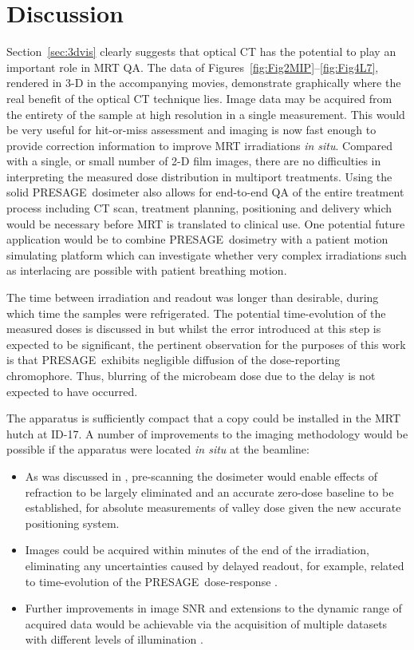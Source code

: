 	
	\section{Discussion}
	Section~\ref{sec:3dvis} clearly suggests that optical CT has the potential to play an important role in MRT QA. The data of Figures~\ref{fig:Fig2MIP}--\ref{fig:Fig4L7}, rendered in 3-D in the accompanying movies, demonstrate graphically where the real benefit of the optical CT technique lies. Image data may be acquired from the entirety of the sample at high resolution in a single measurement. This would be very useful for hit-or-miss assessment and imaging is now fast enough to provide correction information to improve MRT irradiations \textit{in situ}. Compared with a single, or small number of 2-D film images, there are no difficulties in interpreting the measured dose distribution in multiport treatments. Using the solid PRESAGE\textregistered \ dosimeter also allows for end-to-end QA of the entire treatment process including CT scan, treatment planning, positioning and delivery which would be necessary before MRT is translated to clinical use. One potential future application would be to combine PRESAGE\textregistered \ dosimetry with a patient motion simulating platform which can investigate whether very complex irradiations such as interlacing are possible with patient breathing motion. 
	
	The time between irradiation and readout was longer than desirable, during which time the samples were refrigerated. The potential time-evolution of the measured doses is discussed in \cite{doranestablishing2013} but whilst the error introduced at this step is expected to be significant, the pertinent observation for the purposes of this work is that PRESAGE\textregistered \ exhibits negligible diffusion of the dose-reporting chromophore. Thus, blurring of the microbeam dose due to the delay is not expected to have occurred.
	
	The apparatus is sufficiently compact that a copy could be installed in the MRT hutch at ID-17. A number of improvements to the imaging methodology would be possible if the apparatus were located \textit{in situ} at the beamline:
	\begin{itemize}
		\item As was discussed in \cite{doranestablishing2013}, pre-scanning the dosimeter would enable effects of refraction to be largely eliminated and an accurate zero-dose baseline to be established, for absolute measurements of valley dose given the new accurate positioning system.
		\item Images could be acquired within minutes of the end of the irradiation, eliminating any uncertainties caused by delayed readout, for example, related to time-evolution of the PRESAGE\textregistered \ dose-response \cite{skyttemperature2011 , skyttemperature2012}.   
		\item Further improvements in image SNR and extensions to the dynamic range of acquired data would be achievable via the acquisition of multiple datasets with different levels of illumination \cite{krstajiccharacterization2007 , thomasa2011}.
	\end{itemize}
	
